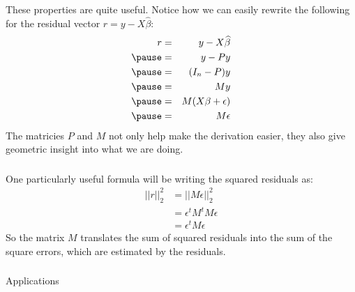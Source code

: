 \begin{frame}[fragile] \frametitle{}

These properties are quite useful. Notice how we can
easily rewrite the following for the residual vector
$r = y - X\widehat{\beta}$:
\begin{eqnarray*}
r  &=& y - X\widehat{\beta} \\ \pause
&=& y - Py \\ \pause
&=& (I_n - P) y \\ \pause
&=& M y \\ \pause
&=& M (X \beta + \epsilon) \\ \pause
&=& M \epsilon \\
\end{eqnarray*}
\pause The matricies $P$ and $M$ not only help make the
derivation easier, they also give geometric insight into
what we are doing.

\end{frame}

\begin{frame}[fragile] \frametitle{}

One particularly useful formula will be writing the
squared residuals as:
\begin{align*}
||r||_2^2 &= || M \epsilon ||_2^2 \\
&= \epsilon^t M^t M \epsilon \\
&= \epsilon^t M \epsilon
\end{align*}
\pause So the matrix $M$ translates the sum of squared residuals
into the sum of the square errors, which are estimated by the
residuals.

\end{frame}

\begin{frame}[fragile] \frametitle{}

\begin{flushright}
{\color{yaleblue}\sc\fontsize{1cm}{0cm}\selectfont Applications}
\end{flushright}

\end{frame}















